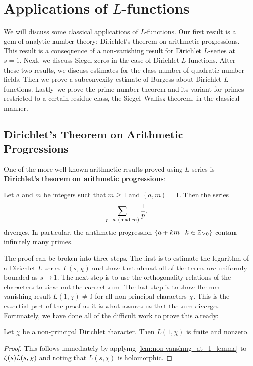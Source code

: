 \chapter{Applications of \texorpdfstring{$L$}{L}-functions}
  We will discuss some classical applications of $L$-functions. Our first result is a gem of analytic number theory: Dirichlet's theorem on arithmetic progressions. This result is a consequence of a non-vanishing result for Dirichlet $L$-series at $s = 1$. Next, we discuss Siegel zeros in the case of Dirichlet $L$-functions. After these two results, we discuss estimates for the class number of quadratic number fields. Then we prove a subconvexity estimate of Burgess about Dirichlet $L$-functions. Lastly, we prove the prime number theorem and its variant for primes restricted to a certain residue class, the Siegel–Walfisz theorem, in the classical manner.
  \section{Dirichlet's Theorem on Arithmetic Progressions}
    One of the more well-known arithmetic results proved using $L$-series is \textbf{Dirichlet's theorem on arithmetic progressions}:

    \begin{theorem}\label{thm:Dirichlet's_theorem_on_primes_in_arithmetic_progressions}
      Let $a$ and $m$ be integers such that $m \ge 1$ and $(a,m) = 1$. Then the series
      \[
        \sum_{p \equiv a \ \left(\text{mod }m\right)}\frac{1}{p},
      \]
      diverges. In particular, the arithmetic progression $\{a+km \mid k \in \mathbb{Z}_{\ge 0}\}$ contain infinitely many primes.
    \end{theorem}

    The proof can be broken into three steps. The first is to estimate the logarithm of a Dirichlet $L$-series $L(s,\chi)$ and show that almost all of the terms are uniformly bounded as $s \to 1$. The next step is to use the orthogonality relations of the characters to sieve out the correct sum. The last step is to show the non-vanishing result $L(1,\chi) \neq 0$ for all non-principal characters $\chi$. This is the essential part of the proof as it is what assures us that the sum diverges. Fortunately, we have done all of the difficult work to prove this already:

    \begin{theorem}\label{thm:non-vanishing_of_Dirichlet_L-functions_at_s=1}
      Let $\chi$ be a non-principal Dirichlet character. Then $L(1,\chi)$ is finite and nonzero.
    \end{theorem}
    \begin{proof}
      This follows immediately by applying \cref{lem:non-vanshing_at_1_lemma} to $\zeta(s)L(s,\chi)$ and noting that $L(s,\chi)$ is holomorphic.
    \end{proof}

